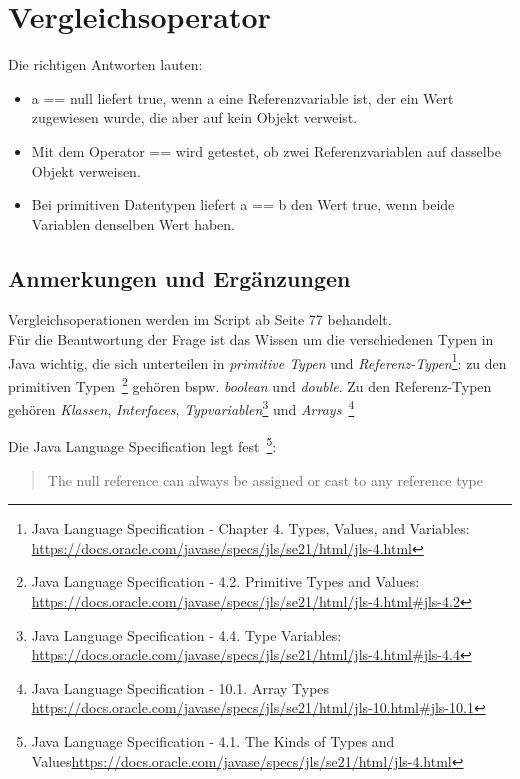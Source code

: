 \chapter{Vergleichsoperator}

Die richtigen Antworten lauten:

\begin{itemize}
    \item a == null liefert true, wenn a eine Referenzvariable ist, der ein Wert zugewiesen wurde, die aber auf kein Objekt verweist.
    \item Mit dem Operator == wird getestet, ob zwei Referenzvariablen auf dasselbe Objekt verweisen.
    \item Bei primitiven Datentypen liefert a == b den Wert true, wenn beide Variablen denselben Wert haben.
\end{itemize}


\section*{Anmerkungen und Ergänzungen}

Vergleichsoperationen werden im Script ab Seite 77 behandelt.\\

Für die Beantwortung der Frage ist das Wissen um die verschiedenen Typen in Java wichtig, die sich unterteilen in
\textit{primitive Typen} und \textit{Referenz-Typen}\footnote{
    Java Language Specification - Chapter 4. Types, Values, and Variables: \url{https://docs.oracle.com/javase/specs/jls/se21/html/jls-4.html}
}: zu den primitiven Typen~\footnote{Java Language Specification - 4.2. Primitive Types and Values: \url{https://docs.oracle.com/javase/specs/jls/se21/html/jls-4.html#jls-4.2}} gehören bspw. \textit{boolean} und \textit{double}.
Zu den Referenz-Typen gehören
\textit{Klassen}, \textit{Interfaces}, \textit{Typvariablen}\footnote{Java Language Specification - 4.4. Type Variables: \url{https://docs.oracle.com/javase/specs/jls/se21/html/jls-4.html#jls-4.4}}
und \textit{Arrays}~\footnote{Java Language Specification - 10.1. Array Types \url{https://docs.oracle.com/javase/specs/jls/se21/html/jls-10.html#jls-10.1}}

Die Java Language Specification legt fest~\footnote{Java Language Specification - 4.1. The Kinds of Types and Values\url{https://docs.oracle.com/javase/specs/jls/se21/html/jls-4.html}}:

\blockquote{
    The null reference can always be assigned or cast to any reference type
}

